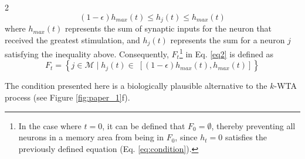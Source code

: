 \documentclass[a4paper, 10pt]{article}
\begin{document}
\begin{multicols}{2}
\begin{equation}\label{eq:condition}
    \left(1 - \epsilon \right)h_{max}(t) \leq h_{j}(t) \leq h_{max}(t)
\end{equation}
where $h_{max}(t)$ represents the sum of synaptic inputs for the neuron that received the greatest stimulation, and $h_{j}(t)$ represents the sum for a neuron $j$ satisfying the inequality above. Consequently, $F_{t}$\footnote{In the case where $t = 0$, it can be defined that $F_0 = \emptyset$, thereby preventing all neurons in a memory area from being in $F_0$, since $h_t = 0$ satisfies the previously defined equation (Eq. \ref{eq:condition}).} in Eq. \ref{eq2} is defined as 
\begin{equation} 
F_{t} = \left\{ j \in \mathcal{M}\; |\; h_{j}(t) \in \; \left[ \left(1 - \epsilon \right)h_{max}(t) , h_{max}(t) \right] \right\}
\end{equation}

The condition presented here is a biologically plausible alternative to the $k$-WTA process (see Figure \ref{fig:paper_1}f). 
\newline

\end{multicols}
\end{document}
